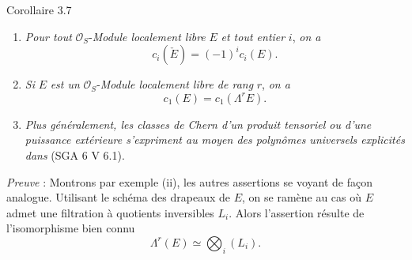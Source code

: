 \begin{statement}{Corollaire 3.7}
\begin{enumerate}[label=(\roman*)]
\item \emph{Pour tout} $\mathcal{O}_S$-\emph{Module localement libre} $E$ \emph{et tout entier} $i$, \emph{on a}
\[
c_i(\check E)=(-1)^i c_i(E).
\]
\item \emph{Si} $E$ \emph{est un} $\mathcal{O}_S$-\emph{Module localement libre de rang} $r$, \emph{on a}
\[
c_1(E)=c_1(\Lambda^rE).
\]
\item \emph{Plus généralement, les classes de Chern d'un produit tensoriel ou d'une puissance extérieure s'expriment au moyen des polynômes universels explicités dans} (SGA 6 V 6.1).
\end{enumerate}
\end{statement}

\emph{Preuve} : Montrons par exemple (ii), les autres assertions se voyant de façon analogue. Utilisant le schéma des drapeaux de $E$, on se ramène au cas où $E$ admet une filtration à quotients inversibles $L_i$. Alors l'assertion résulte de l'isomorphisme bien connu
\[
\Lambda^r(E)\simeq\bigotimes_i (L_i).
\]

